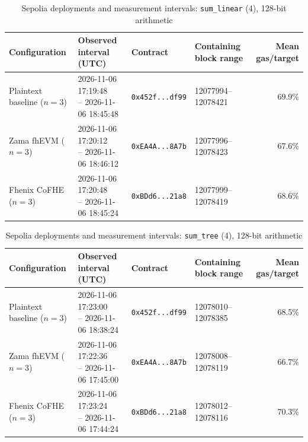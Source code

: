 \begin{table}[!t]
\caption{Sepolia deployments and measurement intervals: \texttt{sum\_linear} (4), 128-bit arithmetic}
\label{tab:sepolia-experiment-deployments-circuits-euint128-circuits-w128-sum-linear-n4}
\centering
\footnotesize
\setlength{\tabcolsep}{4pt}
\begin{tabular}{|l|l|l|l|r|}
\hline
\textbf{Configuration} &
\textbf{Observed interval (UTC)} &
\textbf{Contract} &
\textbf{Containing block range} &
\textbf{Mean gas/target} \\
\hline
Plaintext baseline (\(n=3\)) &
\shortstack[l]{2026-11-06 17:19:48 \\ -- 2026-11-06 18:45:48} &
\texttt{0x452f...df99} &
12077994--12078421 &
69.9\% \\
\hline
Zama fhEVM (\(n=3\)) &
\shortstack[l]{2026-11-06 17:20:12 \\ -- 2026-11-06 18:46:12} &
\texttt{0xEA4A...8A7b} &
12077996--12078423 &
67.6\% \\
\hline
Fhenix CoFHE (\(n=3\)) &
\shortstack[l]{2026-11-06 17:20:48 \\ -- 2026-11-06 18:45:24} &
\texttt{0xBDd6...21a8} &
12077999--12078419 &
68.6\% \\
\hline
\end{tabular}
\end{table}

\begin{table}[!t]
\caption{Sepolia deployments and measurement intervals: \texttt{sum\_tree} (4), 128-bit arithmetic}
\label{tab:sepolia-experiment-deployments-circuits-euint128-circuits-w128-sum-tree-n4}
\centering
\footnotesize
\setlength{\tabcolsep}{4pt}
\begin{tabular}{|l|l|l|l|r|}
\hline
\textbf{Configuration} &
\textbf{Observed interval (UTC)} &
\textbf{Contract} &
\textbf{Containing block range} &
\textbf{Mean gas/target} \\
\hline
Plaintext baseline (\(n=3\)) &
\shortstack[l]{2026-11-06 17:23:00 \\ -- 2026-11-06 18:38:24} &
\texttt{0x452f...df99} &
12078010--12078385 &
68.5\% \\
\hline
Zama fhEVM (\(n=3\)) &
\shortstack[l]{2026-11-06 17:22:36 \\ -- 2026-11-06 17:45:00} &
\texttt{0xEA4A...8A7b} &
12078008--12078119 &
66.7\% \\
\hline
Fhenix CoFHE (\(n=3\)) &
\shortstack[l]{2026-11-06 17:23:24 \\ -- 2026-11-06 17:44:24} &
\texttt{0xBDd6...21a8} &
12078012--12078116 &
70.3\% \\
\hline
\end{tabular}
\end{table}

